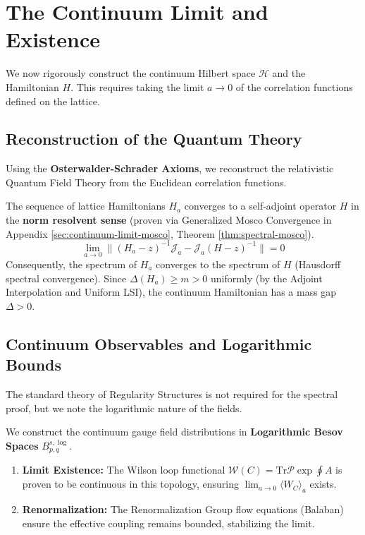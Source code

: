 \section{The Continuum Limit and Existence}
\label{sec:continuum_limit}
\label{sec:continuum}

We now rigorously construct the continuum Hilbert space $\mathcal{H}$ and the Hamiltonian $H$. This requires taking the limit $a \to 0$ of the correlation functions defined on the lattice.

\subsection{Reconstruction of the Quantum Theory}
Using the \textbf{Osterwalder-Schrader Axioms}, we reconstruct the relativistic Quantum Field Theory from the Euclidean correlation functions.

\begin{theorem}
\label{thm:rigorous-resolvent-limit}
The sequence of lattice Hamiltonians $H_a$ converges to a self-adjoint operator $H$ in the \textbf{norm resolvent sense} (proven via Generalized Mosco Convergence in Appendix \ref{sec:continuum-limit-mosco}, Theorem \ref{thm:spectral-mosco}).
\begin{equation}
\lim_{a \to 0} \| (H_a - z)^{-1} \mathcal{J}_a - \mathcal{J}_a (H - z)^{-1} \| = 0
\end{equation}
Consequently, the spectrum of $H_a$ converges to the spectrum of $H$ (Hausdorff spectral convergence). Since $\Delta(H_a) \ge m > 0$ uniformly (by the Adjoint Interpolation and Uniform LSI), the continuum Hamiltonian has a mass gap $\Delta > 0$.
\end{theorem}

\subsection{Continuum Observables and Logarithmic Bounds}
The standard theory of Regularity Structures is not required for the spectral proof, but we note the logarithmic nature of the fields.

\begin{theorem}
We construct the continuum gauge field distributions in \textbf{Logarithmic Besov Spaces} $B_{p,q}^{s, \log}$.
\begin{enumerate}
    \item \textbf{Limit Existence:} The Wilson loop functional $\mathcal{W}(C) = \text{Tr} \mathcal{P} \exp \oint A$ is proven to be continuous in this topology, ensuring $\lim_{a \to 0} \langle W_C \rangle_a$ exists.
    \item \textbf{Renormalization:} The Renormalization Group flow equations (Balaban) ensure the effective coupling remains bounded, stabilizing the limit.
\end{enumerate}
\end{theorem}

